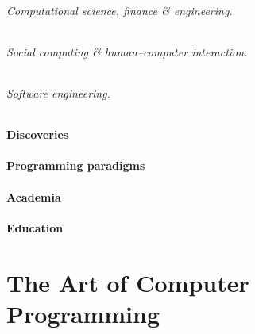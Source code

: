 \documentclass[oneside]{book}
\numberwithin{equation}{section}
\begin{document}
\paragraph{Computational science, finance \& engineering.}

\paragraph{Social computing \& human--computer interaction.}

\paragraph{Software engineering.}

\subsection{Discoveries}

\subsection{Programming paradigms}

\subsection{Academia}

\subsection{Education}


\part{The Art of Computer Programming}
\end{document}
